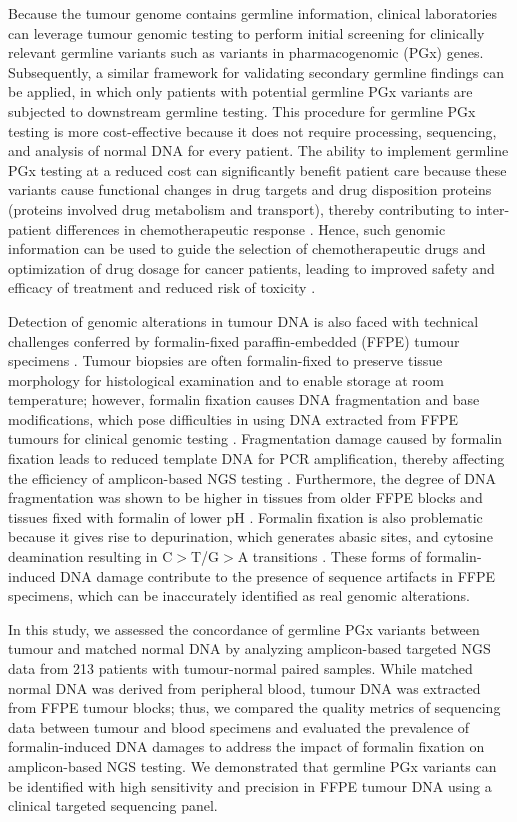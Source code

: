 \documentclass{bmcart}
\begin{document}
Because the tumour genome contains germline information, clinical laboratories can leverage tumour genomic testing to perform initial screening for clinically relevant germline variants such as variants in pharmacogenomic (PGx) genes. Subsequently, a similar framework for validating secondary germline findings can be applied, in which only patients with potential germline PGx variants are subjected to downstream germline testing. This procedure for germline PGx testing is more cost-effective because it does not require processing, sequencing, and analysis of normal DNA for every patient. The ability to implement germline PGx testing at a reduced cost can significantly benefit patient care because these variants cause functional changes in drug targets and drug disposition proteins (proteins involved drug metabolism and transport), thereby contributing to inter-patient differences in chemotherapeutic response \cite{McLeod2013}. Hence, such genomic information can be used to guide the selection of chemotherapeutic drugs and optimization of drug dosage for cancer patients, leading to improved safety and efficacy of treatment and reduced risk of toxicity \cite{McLeod2013}.

Detection of genomic alterations in tumour DNA is also faced with technical challenges conferred by formalin-fixed paraffin-embedded (FFPE) tumour specimens \cite{Do2015,Wong2014}. Tumour biopsies are often formalin-fixed to preserve tissue morphology for histological examination and to enable storage at room temperature; however, formalin fixation causes DNA fragmentation and base modifications, which pose difficulties in using DNA extracted from FFPE tumours for clinical genomic testing \cite{Do2015,Wong2014}. Fragmentation damage caused by formalin fixation leads to reduced template DNA for PCR amplification, thereby affecting the efficiency of amplicon-based NGS testing \cite{Do2015,Wong2014}. Furthermore, the degree of DNA fragmentation was shown to be higher in tissues from older FFPE blocks and tissues fixed with formalin of lower pH \cite{Do2015}. Formalin fixation is also problematic because it gives rise to depurination, which generates abasic sites, and cytosine deamination resulting in C$>$T/G$>$A transitions \cite{Do2015}. These forms of formalin-induced DNA damage contribute to the presence of sequence artifacts in FFPE specimens, which can be inaccurately identified as real genomic alterations.

In this study, we assessed the concordance of germline PGx variants between tumour and matched normal DNA by analyzing amplicon-based targeted NGS data from 213 patients with tumour-normal paired samples. While matched normal DNA was derived from peripheral blood, tumour DNA was extracted from FFPE tumour blocks; thus, we compared the quality metrics of sequencing data between tumour and blood specimens and evaluated the prevalence of formalin-induced DNA damages to address the impact of formalin fixation on amplicon-based NGS testing. We demonstrated that germline PGx variants can be identified with high sensitivity and precision in FFPE tumour DNA using a clinical targeted sequencing panel.
\end{document}
